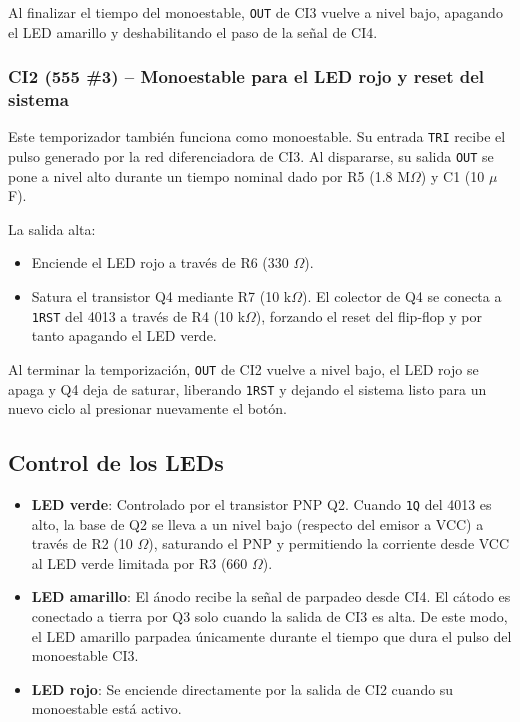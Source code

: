 \documentclass[journal]{IEEEtran}
\begin{document}
Al finalizar el tiempo del monoestable, \texttt{OUT} de CI3 vuelve a nivel bajo, apagando el LED amarillo y deshabilitando el paso de la señal de CI4.

\subsubsection{CI2 (555 \#3) – Monoestable para el LED rojo y reset del sistema}

Este temporizador también funciona como monoestable. Su entrada \texttt{TRI} recibe el pulso generado por la red diferenciadora de CI3. Al dispararse, su salida \texttt{OUT} se pone a nivel alto durante un tiempo nominal dado por R5 (1.8 M$\Omega$) y C1 (10 $\mu$F). 

La salida alta:
\begin{itemize}
    \item Enciende el LED rojo a través de R6 (330 $\Omega$).
    \item Satura el transistor Q4 mediante R7 (10 k$\Omega$). El colector de Q4 se conecta a \texttt{1RST} del 4013 a través de R4 (10 k$\Omega$), forzando el reset del flip-flop y por tanto apagando el LED verde.
\end{itemize}
Al terminar la temporización, \texttt{OUT} de CI2 vuelve a nivel bajo, el LED rojo se apaga y Q4 deja de saturar, liberando \texttt{1RST} y dejando el sistema listo para un nuevo ciclo al presionar nuevamente el botón.

\subsection{Control de los LEDs}

\begin{itemize}
    \item \textbf{LED verde}: Controlado por el transistor PNP Q2. Cuando \texttt{1Q} del 4013 es alto, la base de Q2 se lleva a un nivel bajo (respecto del emisor a VCC) a través de R2 (10 $\Omega$), saturando el PNP y permitiendo la corriente desde VCC al LED verde limitada por R3 (660 $\Omega$).
    \item \textbf{LED amarillo}: El ánodo recibe la señal de parpadeo desde CI4. El cátodo es conectado a tierra por Q3 solo cuando la salida de CI3 es alta. De este modo, el LED amarillo parpadea únicamente durante el tiempo que dura el pulso del monoestable CI3.
    \item \textbf{LED rojo}: Se enciende directamente por la salida de CI2 cuando su monoestable está activo.
\end{itemize}
\end{document}
